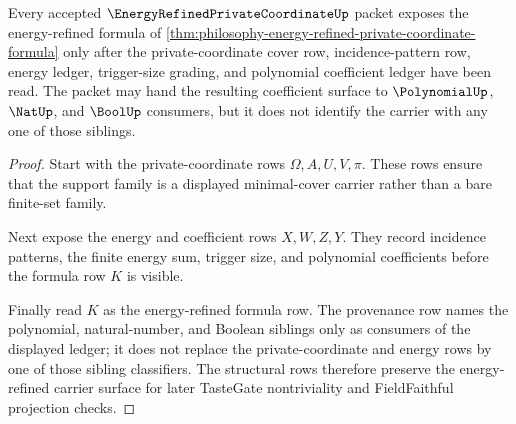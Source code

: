 \begin{theorem}
\label{thm:energy-refined-private-coordinate-polynomial-handoff}
Every accepted $\EnergyRefinedPrivateCoordinateUp$ packet exposes the energy-refined formula of \autoref{thm:philosophy-energy-refined-private-coordinate-formula} only after the private-coordinate cover row, incidence-pattern row, energy ledger, trigger-size grading, and polynomial coefficient ledger have been read. The packet may hand the resulting coefficient surface to $\PolynomialUp$, $\NatUp$, and $\BoolUp$ consumers, but it does not identify the carrier with any one of those siblings.
\end{theorem}
\begin{proof}
Start with the private-coordinate rows $\Omega,A,U,V,\pi$. These rows ensure that the support family is a displayed minimal-cover carrier rather than a bare finite-set family.

Next expose the energy and coefficient rows $X,W,Z,Y$. They record incidence patterns, the finite energy sum, trigger size, and polynomial coefficients before the formula row $K$ is visible.

Finally read $K$ as the energy-refined formula row. The provenance row names the polynomial, natural-number, and Boolean siblings only as consumers of the displayed ledger; it does not replace the private-coordinate and energy rows by one of those sibling classifiers. The structural rows therefore preserve the energy-refined carrier surface for later TasteGate nontriviality and FieldFaithful projection checks.
\end{proof}


\begin{closurestatus}{\EnergyRefinedPrivateCoordinateUp}
  \theoryclosure{\seedClosure}
  \formalstatus{\unformalizedV}
\end{closurestatus}

